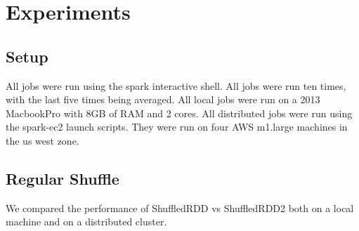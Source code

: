 \chapter{Experiments}

\section{Setup}

All jobs were run using the spark interactive shell.
All jobs were run ten times, with the last five times being averaged.
All local jobs were run on a 2013 MacbookPro with 8GB of RAM and 2 cores.
All distributed jobs were run using the spark-ec2 launch scripts. They were run on 
four AWS m1.large machines in the us west zone. 
\section{Regular Shuffle}

We compared the performance of ShuffledRDD vs ShuffledRDD2 both on a local machine and on a distributed cluster.

